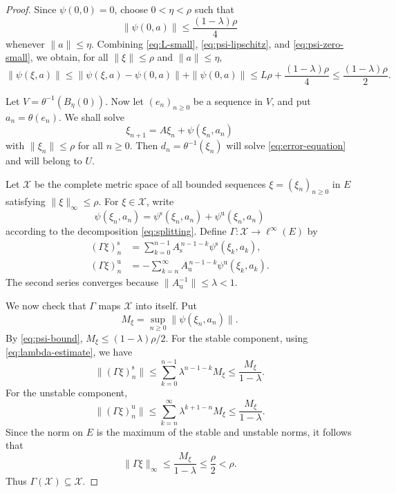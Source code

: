 \documentclass[12pt]{amsart}
\theoremstyle{definition}
\numberwithin{equation}{section}
\theoremstyle{remark}
\begin{document}
\begin{proof}
Since $\psi(0,0)=0$, choose $0<\eta<\rho$ such that
\begin{equation}\label{eq:psi-zero-small}
\|\psi(0,a)\|\leq \frac{(1-\lambda)\rho}{4}
\end{equation}
whenever $\|a\|\leq\eta$. Combining \eqref{eq:L-small},
\eqref{eq:psi-lipschitz},  and
\eqref{eq:psi-zero-small}, we obtain, for all $\|\xi\|\leq\rho$ and
$\|a\|\leq\eta$,
\begin{equation}\label{eq:psi-bound}
\|\psi(\xi,a)\|
\leq
\|\psi(\xi,a)-\psi(0,a)\|+\|\psi(0,a)\|
\leq
L\rho+\frac{(1-\lambda)\rho}{4}
\leq
\frac{(1-\lambda)\rho}{2}.
\end{equation}

Let $V=\theta^{-1}(B_\eta(0))$. Now let $(e_n)_{n\geq 0}$ be a sequence
in $V$, and put $a_n=\theta(e_n)$. We shall solve
\begin{equation}\label{eq:coordinate-recurrence}
\xi_{n+1}=A\xi_n+\psi(\xi_n,a_n)
\end{equation}
with $\|\xi_n\|\leq\rho$ for all $n\geq 0$. Then
$d_n=\theta^{-1}(\xi_n)$ will solve \eqref{eq:error-equation} and will
belong to $U$.

Let $\mathcal X$ be the complete metric space of all bounded sequences
$\xi=(\xi_n)_{n\geq 0}$ in $E$ satisfying $\|\xi\|_\infty\leq\rho$. For
$\xi\in\mathcal X$, write
\[
\psi(\xi_n,a_n)
=
\psi^{\mathrm{s}}(\xi_n,a_n)+\psi^{\mathrm{u}}(\xi_n,a_n)
\]
according to the decomposition \eqref{eq:splitting}. Define
$\Gamma:\mathcal X\to \ell^\infty(E)$ by
\begin{align}
(\Gamma\xi)_n^{\mathrm{s}}
&=
\sum_{k=0}^{n-1}A_{\mathrm{s}}^{\,n-1-k}
\psi^{\mathrm{s}}(\xi_k,a_k),
\label{eq:Gamma-stable}\\
(\Gamma\xi)_n^{\mathrm{u}}
&=
-\sum_{k=n}^{\infty}A_{\mathrm{u}}^{\,n-1-k}
\psi^{\mathrm{u}}(\xi_k,a_k).
\label{eq:Gamma-unstable}
\end{align}
The second series converges because
$\|A_{\mathrm{u}}^{-1}\|\leq\lambda<1$.

We now check that $\Gamma$ maps $\mathcal X$ into itself. Put
\[
M_\xi=\sup_{n\geq 0}\|\psi(\xi_n,a_n)\|.
\]
By \eqref{eq:psi-bound}, $M_\xi\leq (1-\lambda)\rho/2$. For the stable
component, using \eqref{eq:lambda-estimate}, we have
\[
\|(\Gamma\xi)_n^{\mathrm{s}}\|
\leq
\sum_{k=0}^{n-1}\lambda^{n-1-k}M_\xi
\leq
\frac{M_\xi}{1-\lambda}.
\]
For the unstable component,
\[
\|(\Gamma\xi)_n^{\mathrm{u}}\|
\leq
\sum_{k=n}^{\infty}\lambda^{k+1-n}M_\xi
\leq
\frac{M_\xi}{1-\lambda}.
\]
Since the norm on $E$ is the maximum of the stable and unstable norms, it
follows that
\[
\|\Gamma\xi\|_\infty
\leq
\frac{M_\xi}{1-\lambda}
\leq
\frac{\rho}{2}
<\rho.
\]
Thus $\Gamma(\mathcal X)\subseteq\mathcal X$.


\end{proof}
\end{document}
